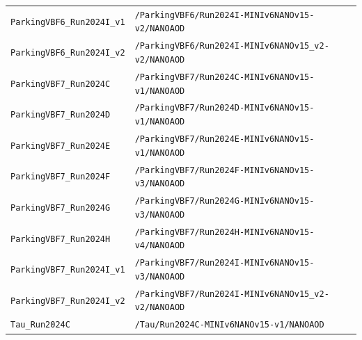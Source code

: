 \begin{longtable}{@{}>{\RaggedRight\arraybackslash}p{} >{\RaggedRight\arraybackslash}p{}@{}}
\addlinespace[2pt]
\texttt{ParkingVBF6\_\allowbreak{}Run2024I\_\allowbreak{}v1} & \texttt{/\allowbreak{}ParkingVBF6/\allowbreak{}Run2024I-\allowbreak{}MINIv6NANOv15-\allowbreak{}v2/\allowbreak{}NANOAOD} \\
\addlinespace[2pt]
\texttt{ParkingVBF6\_\allowbreak{}Run2024I\_\allowbreak{}v2} & \texttt{/\allowbreak{}ParkingVBF6/\allowbreak{}Run2024I-\allowbreak{}MINIv6NANOv15\_\allowbreak{}v2-\allowbreak{}v2/\allowbreak{}NANOAOD} \\
\addlinespace[2pt]
\texttt{ParkingVBF7\_\allowbreak{}Run2024C} & \texttt{/\allowbreak{}ParkingVBF7/\allowbreak{}Run2024C-\allowbreak{}MINIv6NANOv15-\allowbreak{}v1/\allowbreak{}NANOAOD} \\
\addlinespace[2pt]
\texttt{ParkingVBF7\_\allowbreak{}Run2024D} & \texttt{/\allowbreak{}ParkingVBF7/\allowbreak{}Run2024D-\allowbreak{}MINIv6NANOv15-\allowbreak{}v1/\allowbreak{}NANOAOD} \\
\addlinespace[2pt]
\texttt{ParkingVBF7\_\allowbreak{}Run2024E} & \texttt{/\allowbreak{}ParkingVBF7/\allowbreak{}Run2024E-\allowbreak{}MINIv6NANOv15-\allowbreak{}v1/\allowbreak{}NANOAOD} \\
\addlinespace[2pt]
\texttt{ParkingVBF7\_\allowbreak{}Run2024F} & \texttt{/\allowbreak{}ParkingVBF7/\allowbreak{}Run2024F-\allowbreak{}MINIv6NANOv15-\allowbreak{}v3/\allowbreak{}NANOAOD} \\
\addlinespace[2pt]
\texttt{ParkingVBF7\_\allowbreak{}Run2024G} & \texttt{/\allowbreak{}ParkingVBF7/\allowbreak{}Run2024G-\allowbreak{}MINIv6NANOv15-\allowbreak{}v3/\allowbreak{}NANOAOD} \\
\addlinespace[2pt]
\texttt{ParkingVBF7\_\allowbreak{}Run2024H} & \texttt{/\allowbreak{}ParkingVBF7/\allowbreak{}Run2024H-\allowbreak{}MINIv6NANOv15-\allowbreak{}v4/\allowbreak{}NANOAOD} \\
\addlinespace[2pt]
\texttt{ParkingVBF7\_\allowbreak{}Run2024I\_\allowbreak{}v1} & \texttt{/\allowbreak{}ParkingVBF7/\allowbreak{}Run2024I-\allowbreak{}MINIv6NANOv15-\allowbreak{}v3/\allowbreak{}NANOAOD} \\
\addlinespace[2pt]
\texttt{ParkingVBF7\_\allowbreak{}Run2024I\_\allowbreak{}v2} & \texttt{/\allowbreak{}ParkingVBF7/\allowbreak{}Run2024I-\allowbreak{}MINIv6NANOv15\_\allowbreak{}v2-\allowbreak{}v2/\allowbreak{}NANOAOD} \\
\addlinespace[2pt]
\texttt{Tau\_\allowbreak{}Run2024C} & \texttt{/\allowbreak{}Tau/\allowbreak{}Run2024C-\allowbreak{}MINIv6NANOv15-\allowbreak{}v1/\allowbreak{}NANOAOD} \\

\end{longtable}

